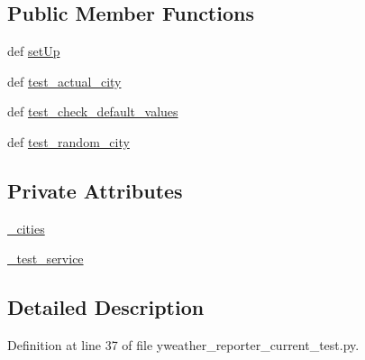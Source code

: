 \subsection*{Public Member Functions}
\begin{DoxyCompactItemize}
\item 
def \hyperlink{classyweather__reporter__current__test_1_1TestCurrentYWeatherReporter_a2a440842b9ff2a7436e0e02efed9147e}{set\-Up}
\item 
def \hyperlink{classyweather__reporter__current__test_1_1TestCurrentYWeatherReporter_aa1f257f1da71d3b53e89958b9d52d31f}{test\-\_\-actual\-\_\-city}
\item 
def \hyperlink{classyweather__reporter__current__test_1_1TestCurrentYWeatherReporter_a6623e1d75e8ed8ecbc1ea8e9365b20f3}{test\-\_\-check\-\_\-default\-\_\-values}
\item 
def \hyperlink{classyweather__reporter__current__test_1_1TestCurrentYWeatherReporter_ac689088ec4885ca58de8c45eeda8f21c}{test\-\_\-random\-\_\-city}
\end{DoxyCompactItemize}
\subsection*{Private Attributes}
\begin{DoxyCompactItemize}
\item 
\hyperlink{classyweather__reporter__current__test_1_1TestCurrentYWeatherReporter_aae34ef78f844aa046cac1dbd8e4c9739}{\-\_\-cities}
\item 
\hyperlink{classyweather__reporter__current__test_1_1TestCurrentYWeatherReporter_aca6a3b24456b3a04a6fbe9cd07c94791}{\-\_\-test\-\_\-service}
\end{DoxyCompactItemize}


\subsection{Detailed Description}


Definition at line 37 of file yweather\-\_\-reporter\-\_\-current\-\_\-test.\-py.



